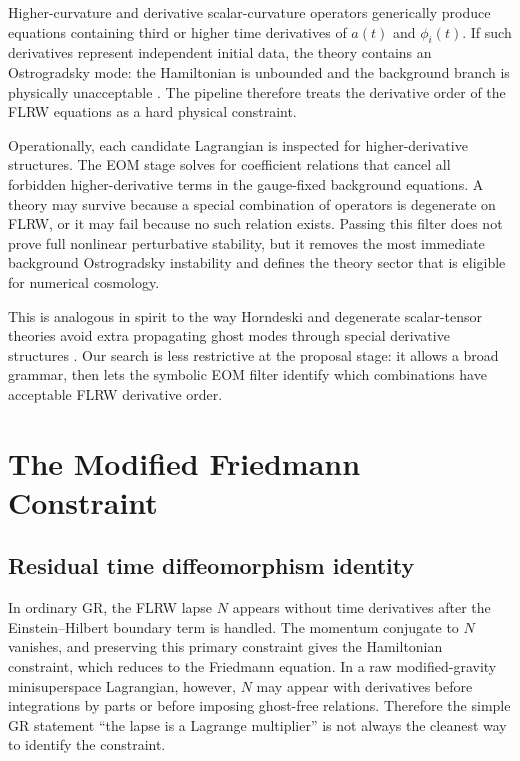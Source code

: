 \documentclass[aps,prd,twocolumn,superscriptaddress,nofootinbib,longbibliography]{revtex4-2}
\begin{document}
Higher-curvature and derivative scalar-curvature operators generically produce equations containing third or higher time derivatives of $a(t)$ and $\phi_i(t)$.  If such derivatives represent independent initial data, the theory contains an Ostrogradsky mode: the Hamiltonian is unbounded and the background branch is physically unacceptable \cite{Ostrogradsky1850}.  The pipeline therefore treats the derivative order of the FLRW equations as a hard physical constraint.

Operationally, each candidate Lagrangian is inspected for higher-derivative structures.  The EOM stage solves for coefficient relations that cancel all forbidden higher-derivative terms in the gauge-fixed background equations.  A theory may survive because a special combination of operators is degenerate on FLRW, or it may fail because no such relation exists.  Passing this filter does not prove full nonlinear perturbative stability, but it removes the most immediate background Ostrogradsky instability and defines the theory sector that is eligible for numerical cosmology.

This is analogous in spirit to the way Horndeski and degenerate scalar-tensor theories avoid extra propagating ghost modes through special derivative structures \cite{Horndeski1974,Langlois2016DHOST}.  Our search is less restrictive at the proposal stage: it allows a broad grammar, then lets the symbolic EOM filter identify which combinations have acceptable FLRW derivative order.

\section{The Modified Friedmann Constraint}
\label{sec:hamiltonian}

\subsection{Residual time diffeomorphism identity}
\label{subsec:noether}

In ordinary GR, the FLRW lapse $N$ appears without time derivatives after the Einstein--Hilbert boundary term is handled.  The momentum conjugate to $N$ vanishes, and preserving this primary constraint gives the Hamiltonian constraint, which reduces to the Friedmann equation.  In a raw modified-gravity minisuperspace Lagrangian, however, $N$ may appear with derivatives before integrations by parts or before imposing ghost-free relations.  Therefore the simple GR statement ``the lapse is a Lagrange multiplier'' is not always the cleanest way to identify the constraint.
\end{document}
